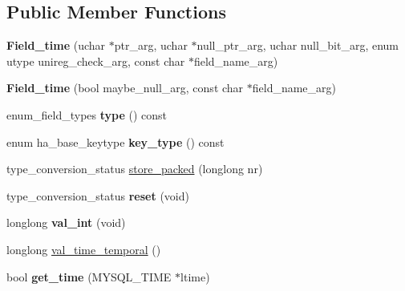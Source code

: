 \subsection*{Public Member Functions}
\begin{DoxyCompactItemize}
\item 
\mbox{\label{classField__time_a4511d2c8e3e9a4a4801f8fa848317e7c}} 
{\bfseries Field\+\_\+time} (uchar $\ast$ptr\+\_\+arg, uchar $\ast$null\+\_\+ptr\+\_\+arg, uchar null\+\_\+bit\+\_\+arg, enum utype unireg\+\_\+check\+\_\+arg, const char $\ast$field\+\_\+name\+\_\+arg)
\item 
\mbox{\label{classField__time_ab1d84c8a7b8b044406570203809514e3}} 
{\bfseries Field\+\_\+time} (bool maybe\+\_\+null\+\_\+arg, const char $\ast$field\+\_\+name\+\_\+arg)
\item 
\mbox{\label{classField__time_af49c18d43e7ae810f40ce77ce66b9bd1}} 
enum\+\_\+field\+\_\+types {\bfseries type} () const
\item 
\mbox{\label{classField__time_a0f71d3351057c2846ade754a70bec667}} 
enum ha\+\_\+base\+\_\+keytype {\bfseries key\+\_\+type} () const
\item 
type\+\_\+conversion\+\_\+status \mbox{\hyperlink{classField__time_af220bb15b6679e6c7dfb7964d9521f6e}{store\+\_\+packed}} (longlong nr)
\item 
\mbox{\label{classField__time_ab33869848874413541a74966a9b653f6}} 
type\+\_\+conversion\+\_\+status {\bfseries reset} (void)
\item 
\mbox{\label{classField__time_af70b0f3d4362b62e768cb746c78fa76c}} 
longlong {\bfseries val\+\_\+int} (void)
\item 
longlong \mbox{\hyperlink{classField__time_a7e15eb097b1cfacdabfa92de7dc3e8ed}{val\+\_\+time\+\_\+temporal}} ()
\item 
\mbox{\label{classField__time_acdb37819ae12a57ffb6aaee30265dee1}} 
bool {\bfseries get\+\_\+time} (M\+Y\+S\+Q\+L\+\_\+\+T\+I\+ME $\ast$ltime)
\item 
\mbox{\label{classField__time_af1aaf29de21eadef0a9f6453f0f9ca01}} 

\end{DoxyCompactItemize}
